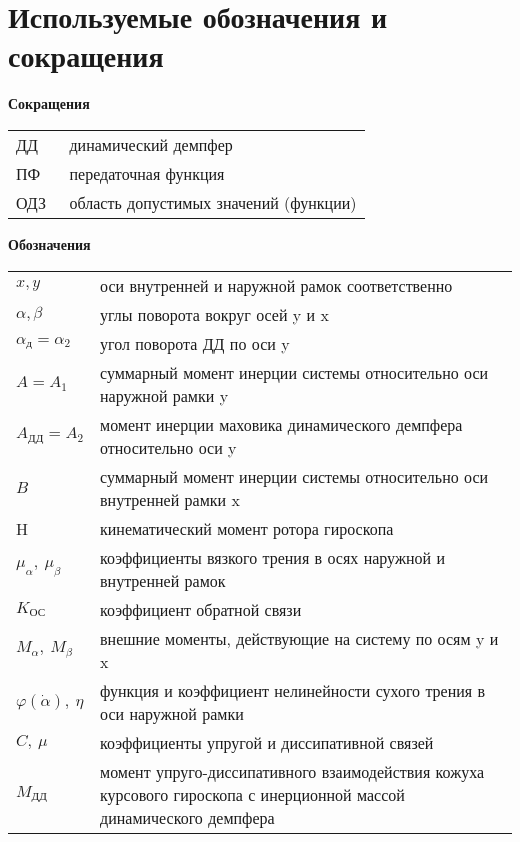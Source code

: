 \documentclass[main.tex]{subfiles}
\begin{document}
\section*{Используемые обозначения и сокращения}
\begin{table}[h]
    \begin{center}
        \textbf{Сокращения}
        \begin{tabular}{p{0.15\linewidth}p{0.85\linewidth}}
            ДД & динамический демпфер \\
            ПФ & передаточная функция \\
            ОДЗ & область допустимых значений (функции) \\
        \end{tabular}
        \textbf{Обозначения}
        \begin{tabular}{p{0.15\linewidth}p{0.85\linewidth}}
            \( x, y \) & оси внутренней и наружной рамок соответственно \\
            \( \alpha, \beta \) & углы поворота вокруг осей y и x \\
            \( \alpha_{\text{д}} =\alpha_2\) & угол поворота ДД  по оси y \\
            \( A=A_1 \) & суммарный момент инерции системы относительно оси наружной рамки y \\
            \( A_\text{ДД}=A_2 \) & момент инерции маховика динамического демпфера относительно оси y \\ 
            \( B \) & суммарный момент инерции системы относительно оси внутренней рамки x \\
            H & кинематический момент ротора гироскопа \\
            \( \mu_\alpha,\ \mu_\beta \) & коэффициенты вязкого трения в осях наружной и внутренней рамок \\
            \( K_{\text{ОС}} \) & коэффициент обратной связи \\
            \( M_\alpha,\ M_\beta \) & внешние моменты, действующие на систему по осям y и x \\
            \( \varphi(\dot{\alpha}),\ \eta \) & функция и коэффициент нелинейности сухого трения в оси наружной рамки \\
            \( C,\ \mu \) & коэффициенты упругой и диссипативной связей \\
            \( M_\text{ДД} \) & момент упруго-диссипативного взаимодействия кожуха курсового
            гироскопа с инерционной массой динамического демпфера \\
        \end{tabular}
    \end{center}    
\end{table}
\end{document}
